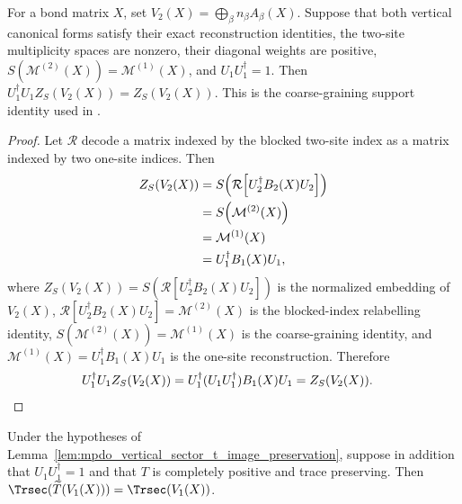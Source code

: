 \begin{lemma}
    \label{lem:mpdo_vertical_sector_s_image_preservation}
    \leanok
    For a bond matrix $X$, set
    $V_2(X)=\bigoplus_\beta n_\beta A_\beta(X)$.
    Suppose that both vertical canonical forms satisfy their exact
    reconstruction identities, the two-site multiplicity spaces are nonzero,
    their diagonal weights are positive,
    $S(\mathcal M^{(2)}(X))=\mathcal M^{(1)}(X)$, and
    $U_1U_1^\dagger=1$. Then
    $U_1^\dagger U_1 Z_S(V_2(X))=Z_S(V_2(X))$.
    This is the coarse-graining support identity used in
    \cite[Appendix~C.4, lines~1955--1980]{Cirac2016MPDO_arXiv}.
\end{lemma}

\begin{proof}\leanok
    Let $\mathcal R$ decode a matrix indexed by the blocked two-site index as a
    matrix indexed by two one-site indices. Then
    \begin{align}
        Z_S(V_2(X))
         & =S\!\left(\mathcal R\!\left[U_2^\dagger B_2(X)U_2\right]\right) \notag \\
         & =S\!\left(\mathcal M^{(2)}(X)\right) \notag                            \\
         & =\mathcal M^{(1)}(X) \notag                                            \\
         & =U_1^\dagger B_1(X)U_1,
        \notag
    \end{align}
    where $Z_S(V_2(X))=S(\mathcal R[U_2^\dagger B_2(X)U_2])$ is the normalized
    embedding of $V_2(X)$,
    $\mathcal R[U_2^\dagger B_2(X) U_2] = \mathcal M^{(2)}(X)$ is the blocked-index relabelling identity,
    $S(\mathcal M^{(2)}(X)) = \mathcal M^{(1)}(X)$ is the coarse-graining identity,
    and $\mathcal M^{(1)}(X) = U_1^\dagger B_1(X) U_1$ is the one-site reconstruction.
    Therefore
    \begin{align}
        U_1^\dagger U_1Z_S(V_2(X))
         & =U_1^\dagger(U_1U_1^\dagger)B_1(X)U_1
        =Z_S(V_2(X)).
        \notag
    \end{align}
\end{proof}

\begin{lemma}
    \label{lem:mpdo_vertical_sector_t_source_generated_trace}
    \leanok
    Under the hypotheses of
    Lemma~\ref{lem:mpdo_vertical_sector_t_image_preservation}, suppose in
    addition that $U_1U_1^\dagger=1$ and that $T$ is completely positive and
    trace preserving. Then
    $\Trsec(\widetilde T(V_1(X)))=\Trsec(V_1(X))$.
\end{lemma}

